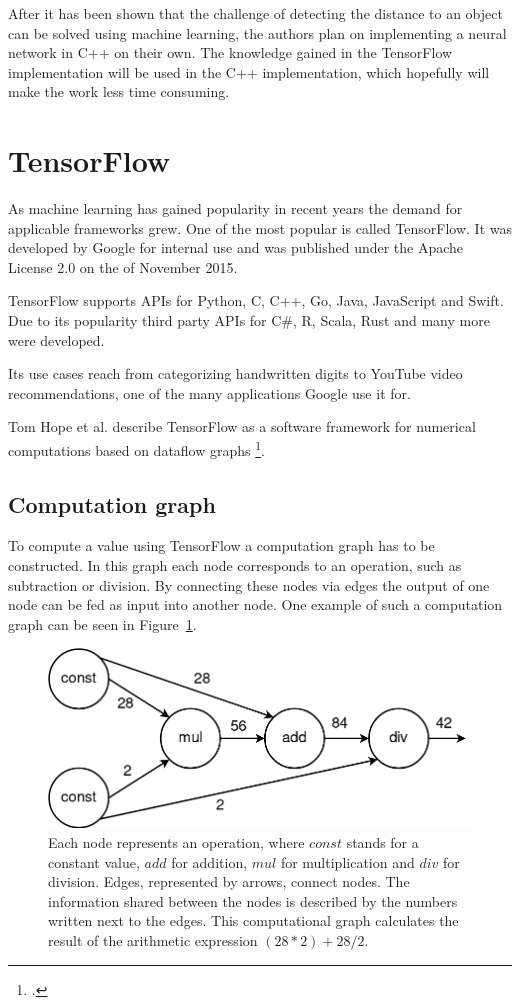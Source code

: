 After it has been shown that the challenge of detecting the distance to an object can be solved using machine learning, the authors plan on implementing a neural network in C++ on their own. The knowledge gained in the TensorFlow implementation will be used in the C++ implementation, which hopefully will make the work less time consuming.

\section{TensorFlow}
As machine learning has gained popularity in recent years the demand for applicable frameworks grew. One of the most popular is called TensorFlow. It was developed by Google for internal use and was published under the Apache License 2.0 on the  of November 2015.

TensorFlow supports APIs for Python, C, C++, Go, Java, JavaScript and Swift.
Due to its popularity third party APIs for C\#, R, Scala, Rust and many more were developed.

Its use cases reach from categorizing handwritten digits to YouTube video recommendations, one of the many applications Google use it for.

Tom Hope et al. describe TensorFlow as a software framework for numerical computations based on dataflow graphs \footcite[page 6]{Hope_Learning_TensorFlow}.

\subsection{Computation graph}
To compute a value using TensorFlow a computation graph has to be constructed. In this graph each node corresponds to an operation, such as subtraction or division. By connecting these nodes via edges the output of one node can be fed as input into another node. One example of such a computation graph can be seen in Figure~\ref{pic:methodology_tensorflow_computationGraph}.

\begin{figure}[h!]
	\centering
	\includegraphics[width=4.5in]{img/methodology_tensorflow_computationGraph.png}
	\caption{Each node represents an operation, where $const$ stands for a constant value, $add$ for addition, $mul$ for multiplication and $div$ for division. Edges, represented by arrows, connect nodes. The information shared between the nodes is described by the numbers written next to the edges. This computational graph calculates the result of the arithmetic expression $(28 * 2) + 28 / 2$.}
	\label{pic:methodology_tensorflow_computationGraph}
\end{figure}

